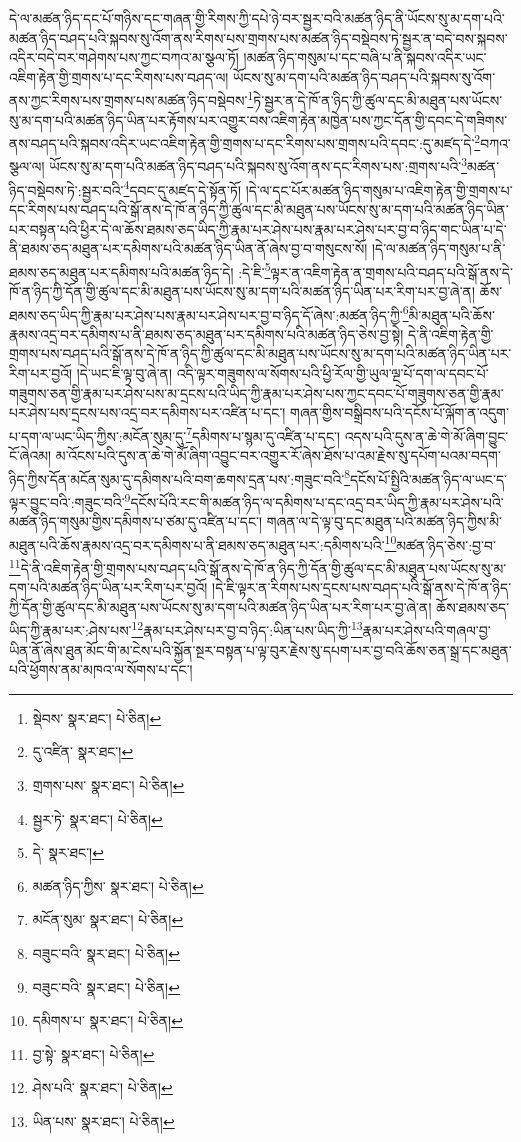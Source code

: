 དེ་ལ་མཚན་ཉིད་དང་པོ་གཉིས་དང་གཞན་གྱི་རིགས་ཀྱི་དཔེ་ཉེ་བར་སྦྱར་བའི་མཚན་ཉིད་ནི་ཡོངས་སུ་མ་དག་པའི་མཚན་ཉིད་བཤད་པའི་སྐབས་སུ་འོག་ནས་རིགས་པས་གྲགས་པས་མཚན་ཉིད་བསྡེབས་ཏེ་སྦྱར་ན་བདེ་བས་སྐབས་འདིར་བདེ་བར་གཤེགས་པས་ཀྱང་བཀའ་མ་སྩལ་ཏོ། །མཚན་ཉིད་གསུམ་པ་དང་བཞི་པ་ནི་སྐབས་འདིར་ཡང་འཇིག་རྟེན་གྱི་གྲགས་པ་དང་རིགས་པས་བཤད་ལ། ཡོངས་སུ་མ་དག་པའི་མཚན་ཉིད་བཤད་པའི་སྐབས་སུ་འོག་ནས་ཀྱང་རིགས་པས་གྲགས་པས་མཚན་ཉིད་བསྡེབས་\footnote{སྡེབས་  སྣར་ཐང་།  པེ་ཅིན། }ཏེ་སྦྱར་ན་དེ་ཁོ་ན་ཉིད་ཀྱི་ཚུལ་དང་མི་མཐུན་པས་ཡོངས་སུ་མ་དག་པའི་མཚན་ཉིད་ཡིན་པར་རྟོགས་པར་འགྱུར་བས་འཇིག་རྟེན་མཁྱེན་པས་ཀྱང་དོན་གྱི་དབང་དེ་གཟིགས་ནས་བཤད་པའི་སྐབས་འདིར་ཡང་འཇིག་རྟེན་གྱི་གྲགས་པ་དང་རིགས་པས་གྲགས་པའི་དབང་:དུ་མཛད་དེ་\footnote{དུ་འཛིན་  སྣར་ཐང་། }བཀའ་སྩལ་ལ། ཡོངས་སུ་མ་དག་པའི་མཚན་ཉིད་བཤད་པའི་སྐབས་སུ་འོག་ནས་དང་རིགས་པས་:གྲགས་པའི་\footnote{གྲགས་པས་  སྣར་ཐང་།  པེ་ཅིན། }མཚན་ཉིད་བསྡེབས་ཏེ་:སྦྱར་བའི་\footnote{སྦྱར་ཏེ་  སྣར་ཐང་།  པེ་ཅིན། }དབང་དུ་མཛད་དེ་སྟོན་ཏོ། །དེ་ལ་དང་པོར་མཚན་ཉིད་གསུམ་པ་འཇིག་རྟེན་གྱི་གྲགས་པ་དང་རིགས་པས་བཤད་པའི་སྒོ་ནས་དེ་ཁོ་ན་ཉིད་ཀྱི་ཚུལ་དང་མི་མཐུན་པས་ཡོངས་སུ་མ་དག་པའི་མཚན་ཉིད་ཡིན་པར་བསྟན་པའི་ཕྱིར་དེ་ལ་ཆོས་ཐམས་ཅད་ཡིད་ཀྱི་རྣམ་པར་ཤེས་པས་རྣམ་པར་ཤེས་པར་བྱ་བ་ཉིད་གང་ཡིན་པ་དེ་ནི་ཐམས་ཅད་མཐུན་པར་དམིགས་པའི་མཚན་ཉིད་ཡིན་ནོ་ཞེས་བྱ་བ་གསུངས་སོ། །དེ་ལ་མཚན་ཉིད་གསུམ་པ་ནི་ཐམས་ཅད་མཐུན་པར་དམིགས་པའི་མཚན་ཉིད་དེ། :དེ་ཇི་\footnote{དེ་  སྣར་ཐང་། }ལྟར་ན་འཇིག་རྟེན་ན་གྲགས་པའི་བཤད་པའི་སྒོ་ནས་དེ་ཁོ་ན་ཉིད་ཀྱི་དོན་གྱི་ཚུལ་དང་མི་མཐུན་པས་ཡོངས་སུ་མ་དག་པའི་མཚན་ཉིད་ཡིན་པར་རིག་པར་བྱ་ཞེ་ན། ཆོས་ཐམས་ཅད་ཡིད་ཀྱི་རྣམ་པར་ཤེས་པས་རྣམ་པར་ཤེས་པར་བྱ་བ་ཉིད་དོ་ཞེས་:མཚན་ཉིད་ཀྱི་\footnote{མཚན་ཉིད་ཀྱིས་  སྣར་ཐང་།  པེ་ཅིན། }མི་མཐུན་པའི་ཆོས་རྣམས་འདྲ་བར་དམིགས་པ་ནི་ཐམས་ཅད་མཐུན་པར་དམིགས་པའི་མཚན་ཉིད་ཅེས་བྱ་སྟེ། དེ་ནི་འཇིག་རྟེན་གྱི་གྲགས་པས་བཤད་པའི་སྒོ་ནས་དེ་ཁོ་ན་ཉིད་ཀྱི་ཚུལ་དང་མི་མཐུན་པས་ཡོངས་སུ་མ་དག་པའི་མཚན་ཉིད་ཡིན་པར་རིག་པར་བྱའོ། །དེ་ཡང་ཇི་ལྟ་བུ་ཞེ་ན། འདི་ལྟར་གཟུགས་ལ་སོགས་པའི་ཕྱི་རོལ་གྱི་ཡུལ་ལྔ་པོ་དག་ལ་དབང་པོ་གཟུགས་ཅན་གྱི་རྣམ་པར་ཤེས་པས་མ་དྲངས་པའི་ཡིད་ཀྱི་རྣམ་པར་ཤེས་པས་ཀྱང་དབང་པོ་གཟུགས་ཅན་གྱི་རྣམ་པར་ཤེས་པས་དྲངས་པས་འདྲ་བར་དམིགས་པར་འཛིན་པ་དང་། གཞན་གྱིས་བསྒྲིབས་པའི་དངོས་པོ་ལྐོག་ན་འདུག་པ་དག་ལ་ཡང་ཡིད་ཀྱིས་:མངོན་སུམ་དུ་\footnote{མངོན་སུམ་  སྣར་ཐང་།  པེ་ཅིན། }དམིགས་པ་སྙམ་དུ་འཛིན་པ་དང་། འདས་པའི་དུས་ན་ཆེ་གེ་མོ་ཞིག་བྱུང་ངོ་ཞེའམ། མ་འོངས་པའི་དུས་ན་ཆེ་གེ་མོ་ཞིག་འབྱུང་བར་འགྱུར་རོ་ཞེས་ཐོས་པ་འམ་རྗེས་སུ་དཔོག་པའམ་བདག་ཉིད་ཀྱིས་དོན་མངོན་སུམ་དུ་དམིགས་པའི་བག་ཆགས་དྲན་པས་:གཟུང་བའི་\footnote{བཟུང་བའི་  སྣར་ཐང་།  པེ་ཅིན། }དངོས་པོ་སྤྱིའི་མཚན་ཉིད་ལ་ཡང་ད་ལྟར་བྱུང་བའི་:གཟུང་བའི་\footnote{བཟུང་བའི་  སྣར་ཐང་།  པེ་ཅིན། }དངོས་པོའི་རང་གི་མཚན་ཉིད་ལ་དམིགས་པ་དང་འདྲ་བར་ཡིད་ཀྱི་རྣམ་པར་ཤེས་པའི་མཚན་ཉིད་གསུམ་གྱིས་དམིགས་པ་ཙམ་དུ་འཛིན་པ་དང་། གཞན་ལ་དེ་ལྟ་བུ་དང་མཐུན་པའི་མཚན་ཉིད་ཀྱིས་མི་མཐུན་པའི་ཆོས་རྣམས་འདྲ་བར་དམིགས་པ་ནི་ཐམས་ཅད་མཐུན་པར་:དམིགས་པའི་\footnote{དམིགས་པ་  སྣར་ཐང་།  པེ་ཅིན། }མཚན་ཉིད་ཅེས་:བྱ་བ་\footnote{བྱ་སྟེ་  སྣར་ཐང་།  པེ་ཅིན། }དེ་ནི་འཇིག་རྟེན་གྱི་གྲགས་པས་བཤད་པའི་སྒོ་ནས་དེ་ཁོ་ན་ཉིད་ཀྱི་དོན་གྱི་ཚུལ་དང་མི་མཐུན་པས་ཡོངས་སུ་མ་དག་པའི་མཚན་ཉིད་ཡིན་པར་རིག་པར་བྱའོ། །དེ་ཇི་ལྟར་ན་རིགས་པས་དྲངས་པས་བཤད་པའི་སྒོ་ནས་དེ་ཁོ་ན་ཉིད་ཀྱི་དོན་གྱི་ཚུལ་དང་མི་མཐུན་པས་ཡོངས་སུ་མ་དག་པའི་མཚན་ཉིད་ཡིན་པར་རིག་པར་བྱ་ཞེ་ན། ཆོས་ཐམས་ཅད་ཡིད་ཀྱི་རྣམ་པར་:ཤེས་པས་\footnote{ཤེས་པའི་  སྣར་ཐང་།  པེ་ཅིན། }རྣམ་པར་ཤེས་པར་བྱ་བ་ཉིད་:ཡིན་པས་ཡིད་ཀྱི་\footnote{ཡིན་པས་  སྣར་ཐང་།  པེ་ཅིན། }རྣམ་པར་ཤེས་པའི་གཞལ་བྱ་ཡིན་ནོ་ཞེས་ཐུན་མོང་གི་མ་ངེས་པའི་སྐྱོན་སྔར་བསྟན་པ་ལྟ་བུར་རྗེས་སུ་དཔག་པར་བྱ་བའི་ཆོས་ཅན་སྒྲ་དང་མཐུན་པའི་ཕྱོགས་ནམ་མཁའ་ལ་སོགས་པ་དང་། 